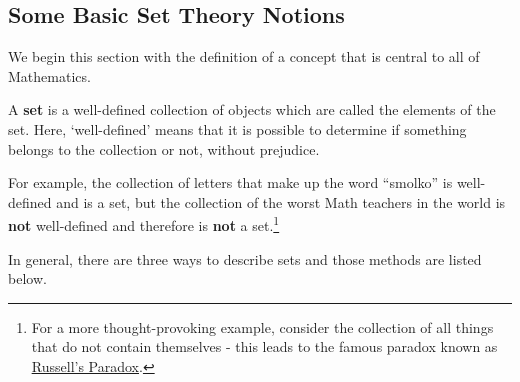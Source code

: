\documentclass{ximera}
\begin{document}
	\author{Stitz-Zeager}




\setcounter{footnote}{0}

\label{AppSetTheory}

\subsection{Some Basic Set Theory Notions}
\label{SetTheoryNotions}

We begin this section with the definition of a concept that is central to all of Mathematics.

\medskip

\colorbox{ResultColor}{\bbm

\begin{definition} \label{setdef}

A \textbf{set} is a well-defined collection of objects which are called the elements of the set.  Here, `well-defined' means that it is possible to determine if something belongs to the collection or not, without prejudice. 

\end{definition}

\ebm}

\medskip

For example, the collection of letters that make up the word ``smolko'' is well-defined and is a set, but the collection of the worst Math teachers in the world is \textbf{not} well-defined and therefore is \textbf{not} a set.\footnote{For a more thought-provoking example, consider the collection of all things that do not contain themselves - this leads to the famous paradox known as \href{http://en.wikipedia.org/wiki/Russell's_paradox}{\underline{Russell's Paradox}}.}  

\smallskip

In general, there are three ways to describe sets and those methods are listed below.

\medskip

 \label{waystodescribesets}
\end{document}

